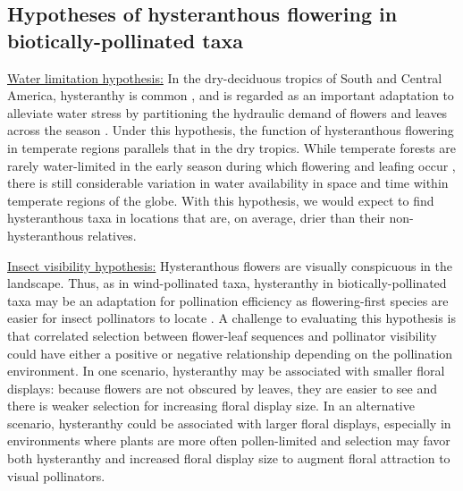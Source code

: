 \documentclass{article}[12pt]
\begin{document}
\subsection*{Hypotheses of hysteranthous flowering in biotically-pollinated taxa}

\underline{Water limitation hypothesis:} In the dry-deciduous tropics of South and Central America, hysteranthy is common \citep{Rathcke_1985,Franklin2016}, and is regarded as an important adaptation to alleviate water stress by partitioning the hydraulic demand of flowers and leaves across the season \citep{Borchert1983,Reich1984,Franklin2016,Gougherty2018}. Under this hypothesis, the function of hysteranthous flowering in temperate regions parallels that in the dry tropics. While temperate forests are rarely water-limited in the early season during which flowering and leafing occur \citep{Polgar2011}, there is still considerable variation in water availability in space and time within temperate regions of the globe.  With this hypothesis, we would expect to find hysteranthous taxa in locations that are, on average, drier than their non-hysteranthous relatives.

\underline{Insect visibility hypothesis:} Hysteranthous flowers are visually conspicuous in the landscape. Thus, as in wind-pollinated taxa, hysteranthy in biotically-pollinated taxa may be an adaptation for pollination efficiency as flowering-first species are easier for insect pollinators to locate \citep{Janzen1967}. A challenge to evaluating this hypothesis is that correlated selection between flower-leaf sequences and pollinator visibility could have either a positive or negative relationship depending on the pollination environment. In one scenario, hysteranthy may be associated with smaller floral displays: because flowers are not obscured by leaves, they are easier to see and there is weaker selection for increasing floral display size. In an alternative scenario, hysteranthy could be associated with larger floral displays, especially in environments where plants are more often pollen-limited and selection may favor both hysteranthy and increased floral display size to augment floral attraction to visual pollinators.
\end{document}
